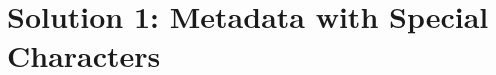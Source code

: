 
\section{Solution 1:  Metadata with Special
Characters}\label{s:Implementation-Solution1}

% 	
% 		
% 	
